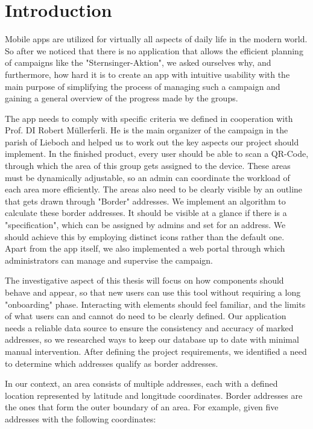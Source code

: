 
\section{Introduction}

Mobile apps are utilized for virtually all aspects of daily life in the modern world. So after we noticed that there is no application that allows the efficient planning of campaigns like the "Sternsinger-Aktion", we asked ourselves why, and furthermore, how hard it is to create an app with intuitive usability with the main purpose of simplifying the process of managing such a campaign and gaining a general overview of the progress made by the groups.

\blankLine

The app needs to comply with specific criteria we defined in cooperation with Prof. DI Robert Müllerferli. He is the main organizer of the campaign in the parish of Lieboch and helped us to work out the key aspects our project should implement. In the finished product, every user should be able to scan a QR-Code, through which the area of this group gets assigned to the device. These areas must be dynamically adjustable, so an admin can coordinate the workload of each area more efficiently. The areas also need to be clearly visible by an outline that gets drawn through "Border" addresses. We implement an algorithm to calculate these border addresses. It should be visible at a glance if there is a "specification", which can be assigned by admins and set for an address. We should achieve this by employing distinct icons rather than the default one. Apart from the app itself, we also implemented a web portal through which administrators can manage and supervise the campaign. 

\blankLine

The investigative aspect of this thesis will focus on how components should behave and appear, so that new users can use this tool without requiring a long "onboarding" phase. Interacting with elements should feel familiar, and the limits of what users can and cannot do need to be clearly defined. Our application needs a reliable data source to ensure the consistency and accuracy of marked addresses, so we researched ways to keep our database up to date with minimal manual intervention. After defining the project requirements, we identified a need to determine which addresses qualify as border addresses. 

\pagebreak

In our context, an area consists of multiple addresses, each with a defined location represented by latitude and longitude coordinates. Border addresses are the ones that form the outer boundary of an area. For example, given five addresses with the following coordinates:


